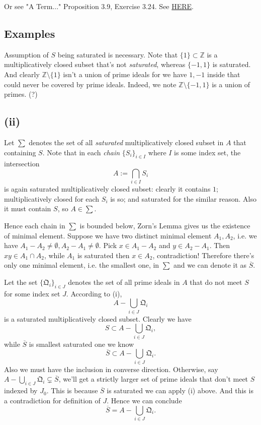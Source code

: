 Or see "A Term..." Proposition 3.9, Exercise 3.24. See \href{https://math.stackexchange.com/questions/4329999/saturated-set-and-union-of-prime-ideals}{HERE}. 

\subsection{Examples}

Assumption of $S$ being saturated is necessary. Note that $\{1\}\subset \mathbb Z$ is a multiplicatively closed subset that's not \textit{saturated}, whereas $\{-1,1\}$ is saturated. And clearly $\mathbb Z\setminus \{1\}$ isn't a union of prime ideals for we have $1,-1$ inside that could never be covered by prime ideals. Indeed, we note $\mathbb Z\setminus \{-1,1\}$ is a union of primes. (?) 

\subsection{(ii)}

Let $\sum$ denotes the set of all \textit{saturated} multiplicatively closed subset in $A$ that containing $S$. Note that in each \textit{chain} $\{S_i\}_{i\in I}$ where $I$ is some index set, the intersection 
$$A:=\bigcap_{i\in I} S_i$$ is again saturated multiplicatively closed subset: clearly it contains $1$; multiplicatively closed for each $S_i$ is so; and saturated for the similar reason. Also it must contain $S$, so $A\in\sum$.

Hence each chain in $\sum$ is bounded below, Zorn's Lemma gives us the existence of minimal element. 
Suppose we have two distinct minimal element $A_1,A_2$, i.e. we have $A_1-A_2\neq\emptyset,A_2-A_1\neq\emptyset$. Pick $x\in A_1-A_2$ and $y\in A_2-A_1$. Then $xy\in A_1\cap A_2$, while $A_1$ is saturated then $x\in A_2$, contradiction! Therefore there's only one minimal element, i.e. the smallest one, in $\sum$ and we can denote it as $\overline{S}$.

Let the set $\{\mathfrak Q_i\}_{i\in J}$ denotes the set of all prime ideals in $A$ that do not meet $S$ for some index set $J$. According to (i),
$$A-\bigcup_{i\in J}\mathfrak Q_i$$ is a saturated multiplicatively closed subset. 
Clearly we have 
$$S\subset A-\bigcup_{i\in J}\mathfrak Q_i,$$ while $\overline{S}$ is smallest saturated one we know
$$\overline{S} \subset A-\bigcup_{i\in J}\mathfrak Q_i.$$
Also we must have the inclusion in converse direction. Otherwise, say $A-\bigcup_{i\in J}\mathfrak Q_i\subsetneq \overline{S}$, we'll get a strictly larger set of prime ideals that don't meet $S$ indexed by $J_0$. This is because $\overline{S}$ is saturated we can apply (i) above. And this is a contradiction for definition of $J$. Hence we can conclude 
$$\overline{S}= A-\bigcup_{i\in J}\mathfrak Q_i.$$


